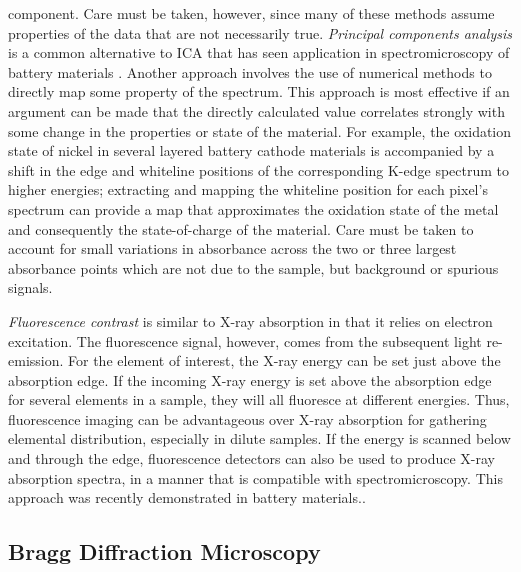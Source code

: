 \documentclass[journal=cmatex,manuscript=perspective]{achemso}
\begin{document}
component\cite{bioucas2012,duarte2014}. Care must be taken, however,
since many of these methods assume properties of the data that are not
necessarily true. \emph{Principal components analysis} is a common
alternative to ICA that has seen application in spectromicroscopy of
battery materials \cite{shapiro2014,boesenberg2013}. Another approach
involves the use of numerical methods to directly map some property of
the spectrum. This approach is most effective if an argument can be
made that the directly calculated value correlates strongly with some
change in the properties or state of the material. For example, the
oxidation state of nickel in several layered battery cathode materials
is accompanied by a shift in the edge and whiteline positions of the
corresponding K-edge spectrum to higher energies\cite{deb2006};
extracting and mapping the whiteline position for each pixel's
spectrum can provide a map that approximates the oxidation state of
the metal and consequently the state-of-charge of the material. Care
must be taken to account for small variations in absorbance across the
two or three largest absorbance points which are not due to the
sample, but background or spurious signals.

\emph{Fluorescence contrast} is similar to X-ray absorption in that it
relies on electron excitation. The fluorescence signal, however, comes
from the subsequent light re-emission. For the element of interest,
the X-ray energy can be set just above the absorption edge. If the
incoming X-ray energy is set above the absorption edge for several
elements in a sample, they will all fluoresce at different
energies. Thus, fluorescence imaging can be advantageous over X-ray
absorption for gathering elemental distribution, especially in dilute
samples. If the energy is scanned below and through the edge,
fluorescence detectors can also be used to produce X-ray absorption
spectra, in a manner that is compatible with spectromicroscopy. This
approach was recently demonstrated in battery
materials.\cite{chueh2015}.

\subsection{Bragg Diffraction Microscopy}
\end{document}
